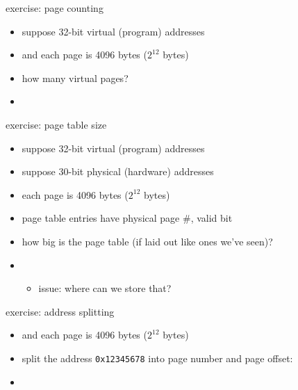 \begin{frame}{exercise: page counting}
    \begin{itemize}
        \item suppose 32-bit virtual (program) addresses
        \item and each page is 4096 bytes ($2^{12}$ bytes)
            \vspace{.5cm}
        \item how many virtual pages?
        \item<2-> \iftoggle{heldback}{}{$2^{32} / 2^{12} = 2^{20}$}
    \end{itemize}
\end{frame}

\begin{frame}{exercise: page table size}
    \begin{itemize}
        \item suppose 32-bit virtual (program) addresses
        \item suppose 30-bit physical (hardware) addresses
        \item each page is 4096 bytes ($2^{12}$ bytes)
        \item page table entries have physical page \#, valid bit
            \vspace{.5cm}
        \item how big is the page table (if laid out like ones we've seen)? 
        \item<2-> \iftoggle{heldback}{}{$2^{20}$ entries $\times (18 + 1)$ bits per entry}
            \begin{itemize}
            \item issue: where can we store that?
            \end{itemize}
    \end{itemize}
\end{frame}

\begin{frame}{exercise: address splitting}
    \begin{itemize}
    \item and each page is 4096 bytes ($2^{12}$ bytes)
    \item split the address {\tt 0x12345678} into page number and page offset:
    \item<2-> \iftoggle{heldback}{}{page \#: {\tt0x12345}; offset: {\tt 0x678}}
    \end{itemize}
\end{frame}
